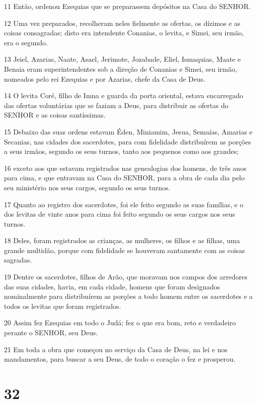 \par 11 Então, ordenou Ezequias que se preparassem depósitos na Casa do SENHOR.
\par 12 Uma vez preparados, recolheram neles fielmente as ofertas, os dízimos e as coisas consagradas; disto era intendente Conanias, o levita, e Simei, seu irmão, era o segundo.
\par 13 Jeiel, Azarias, Naate, Asael, Jerimote, Jozabade, Eliel, Ismaquias, Maate e Benaia eram superintendentes sob a direção de Conanias e Simei, seu irmão, nomeados pelo rei Ezequias e por Azarias, chefe da Casa de Deus.
\par 14 O levita Coré, filho de Imna e guarda da porta oriental, estava encarregado das ofertas voluntárias que se faziam a Deus, para distribuir as ofertas do SENHOR e as coisas santíssimas.
\par 15 Debaixo das suas ordens estavam Éden, Miniamim, Jesua, Semaías, Amarias e Secanias, nas cidades dos sacerdotes, para com fidelidade distribuírem as porções a seus irmãos, segundo os seus turnos, tanto aos pequenos como aos grandes;
\par 16 exceto aos que estavam registrados nas genealogias dos homens, de três anos para cima, e que entravam na Casa do SENHOR, para a obra de cada dia pelo seu ministério nos seus cargos, segundo os seus turnos.
\par 17 Quanto ao registro dos sacerdotes, foi ele feito segundo as suas famílias, e o dos levitas de vinte anos para cima foi feito segundo os seus cargos nos seus turnos.
\par 18 Deles, foram registrados as crianças, as mulheres, os filhos e as filhas, uma grande multidão, porque com fidelidade se houveram santamente com as coisas sagradas.
\par 19 Dentre os sacerdotes, filhos de Arão, que moravam nos campos dos arredores das suas cidades, havia, em cada cidade, homens que foram designados nominalmente para distribuírem as porções a todo homem entre os sacerdotes e a todos os levitas que foram registrados.
\par 20 Assim fez Ezequias em todo o Judá; fez o que era bom, reto e verdadeiro perante o SENHOR, seu Deus.
\par 21 Em toda a obra que começou no serviço da Casa de Deus, na lei e nos mandamentos, para buscar a seu Deus, de todo o coração o fez e prosperou.

\chapter{32}

